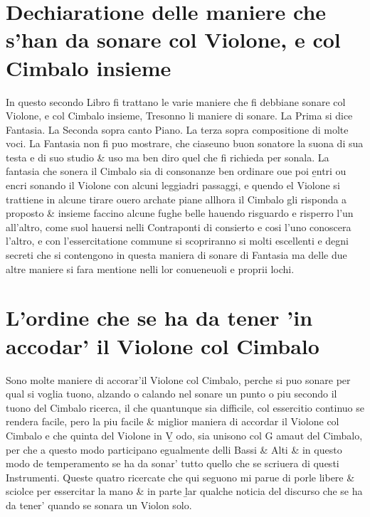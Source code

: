 \chapter{Dechiaratione delle maniere che s'han da sonare col Violone, e col Cimbalo insieme}
In questo secondo Libro fi trattano le varie maniere che fi debbiane sonare col Violone, e col Cimbalo insieme, Tresonno li maniere di sonare. La Prima si dice Fantasia. La Seconda sopra canto Piano. La terza sopra compositione di molte voci. La Fantasia non fi puo mostrare, che ciaseuno buon sonatore la suona di sua testa e di suo studio \& uso ma ben diro quel che fi richieda per sonala. La fantasia che sonera il Cimbalo sia di consonanze ben ordinare oue poi \b{entri ou encri} sonando il Violone con alcuni leggiadri passaggi, e quendo el Violone si trattiene in alcune tirare ouero archate piane allhora il Cimbalo gli risponda a proposto \& insieme faccino alcune fughe belle hauendo risguardo e risperro l'un all'altro, come suol hauersi nelli Contraponti di consierto e cosi l'uno conoscera l'altro, e con l'essercitatione commune si scopriranno si molti escellenti e degni secreti che si contengono in questa maniera di sonare di Fantasia ma delle due altre maniere si fara mentione nelli lor conueneuoli e proprii lochi.

\chapter{L'ordine che se ha da tener 'in accodar' il Violone col Cimbalo}
Sono molte maniere di accorar'il Violone col Cimbalo, perche si puo sonare per qual si voglia tuono, alzando o calando nel sonare un punto o piu secondo il tuono del Cimbalo ricerca, il che quantunque sia difficile, col essercitio continuo se rendera facile, pero la piu facile \& miglior maniera di accordar il Violone col Cimbalo e che quinta del Violone in \b{V odo}, sia unisono col G amaut del Cimbalo, per che a questo modo participano egualmente delli Bassi \& Alti \& in questo modo de temperamento se ha da sonar' tutto quello che se scriuera di questi Instrumenti.
Queste quatro ricercate che qui seguono mi parue di porle libere \& sciolce per essercitar la mano \& in parte \b{lar} qualche noticia del discurso che se ha da tener' quando se sonara un Violon solo.
